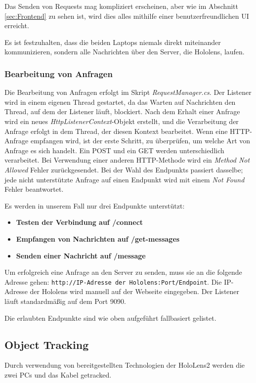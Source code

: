 Das Senden von Requests mag kompliziert erscheinen, aber wie im Abschnitt \ref{sec:Frontend} zu sehen ist, wird dies
alles mithilfe einer benutzerfreundlichen UI erreicht.

Es ist festzuhalten, dass die beiden Laptops niemals direkt miteinander kommunizieren, sondern alle Nachrichten über den
Server, die Hololens, laufen.

\subsubsection{Bearbeitung von Anfragen}
Die Bearbeitung von Anfragen erfolgt im Skript \textit{RequestManager.cs}. Der Listener wird in einem eigenen Thread
gestartet, da das Warten auf Nachrichten den Thread, auf dem der Listener läuft, blockiert. Nach dem Erhalt einer Anfrage
wird ein neues \textit{HttpListenerContext}-Objekt erstellt, und die Verarbeitung der Anfrage erfolgt in dem Thread, der
diesen Kontext bearbeitet. Wenn eine HTTP-Anfrage empfangen wird, ist der erste Schritt, zu überprüfen, um welche Art von
Anfrage es sich handelt. Ein POST und ein GET werden unterschiedlich verarbeitet. Bei Verwendung einer anderen HTTP-Methode
wird ein \textit{Method Not Allowed} Fehler zurückgesendet. Bei der Wahl des Endpunkts passiert dasselbe; jede nicht
unterstützte Anfrage auf einen Endpunkt wird mit einem \textit{Not Found} Fehler beantwortet.

Es werden in unserem Fall nur drei Endpunkte unterstützt:

\begin{itemize}
    \item \textbf{Testen der Verbindung auf /connect}
    \item \textbf{Empfangen von Nachrichten auf /get-messages}
    \item \textbf{Senden einer Nachricht auf /message}
\end{itemize}

Um erfolgreich eine Anfrage an den Server zu senden, muss sie an die folgende Adresse
gehen: \texttt{http://{IP-Adresse der Hololens}:{Port}/{Endpoint}}. Die IP-Adresse der Hololens wird manuell auf der
Webseite eingegeben. Der Listener läuft standardmäßig auf dem Port 9090.

Die erlaubten Endpunkte sind wie oben aufgeführt fallbasiert gelistet.

\subsection{Object Tracking} 
Durch verwendung von bereitgestellten Technologien der HoloLens2
werden die zwei PCs und das Kabel getracked.

